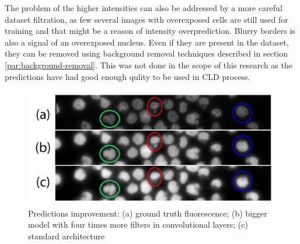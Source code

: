 The problem of the higher intensities can also be addressed by a more careful dataset filtration, as few several images with overexposed cells are still used for training and that might be a reason of intensity overprediction. Blurry borders is also a signal of an overexposed nucleus. Even if they are present in the dataset, they can be removed using background removal techniques described in section \ref{par:background-removal}. This was not done in the scope of this research as the predictions have had good enough qulity to be used in CLD process.

\begin{figure}[H]
	\begin{center}
		\includegraphics[width=0.6\linewidth]{bilder/nuclei/bigger-model.png}
		\caption{Predictions improvement: (a) ground truth fluorescence; (b) bigger model with four times more filters in convolutional layers; (c) standard architecture}\label{fig:better-nuclei}
	\end{center}
\end{figure}